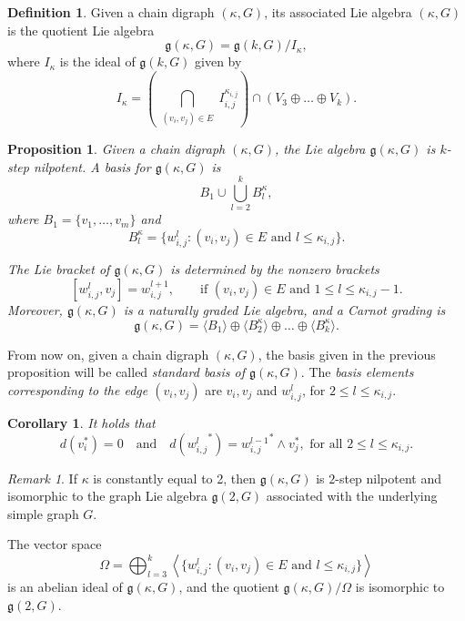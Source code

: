 \documentclass[a4paper,11pt]{amsart}
\newtheorem{corollary}[theorem]{Corollary}
\newtheorem{proposition}[theorem]{Proposition}
\theoremstyle{definition}
\newtheorem{definition}[theorem]{Definition}
\theoremstyle{remark}
\newtheorem{remark}[theorem]{Remark}
\numberwithin{equation}{section}
\newcommand{\g}{\mathfrak{g}}
\begin{document}
\begin{definition}
Given a chain digraph $(\kappa,G)$, 
its associated Lie algebra $(\kappa,G)$ is the quotient Lie algebra
\[
\g(\kappa,G)=\g(k,G)/ I_\kappa,
\]
where $I_\kappa$ is the ideal of $\g(k,G)$ given by
\[
I_\kappa=\left(\bigcap_{\substack{(v_i,v_j)\in E}} I_{i,j}^{\kappa_{i,j}}\right) \cap \left(V_3\oplus\dots\oplus V_k\right).
\]
\end{definition}


\begin{proposition}\label{prop:bracket}
Given a chain digraph $(\kappa,G)$, the Lie algebra $\g(\kappa,G)$ is $k$-step nilpotent. 
A basis for $\g(\kappa,G)$ is
\[
B_1\cup \bigcup_{l=2}^{k} B_l^\kappa,
\]
where $B_1=\{v_1,\dots, v_m\}$ and
\[
B_l^\kappa= \big\{w_{i,j}^l: (v_i,v_j)\in E \text{ and } l\leq \kappa_{i,j} \big\}.
\]

The Lie bracket of $\g(\kappa,G)$ is determined by the nonzero brackets
\[
[w_{i,j}^l, v_j]=w_{i,j}^{l+1}, \qquad \text{if } (v_i,v_j)\in E \text{ and } 1\leq l\leq \kappa_{i,j}-1.
\]
Moreover, $\g(\kappa,G)$ is a naturally graded Lie algebra, and a Carnot grading is
\[
\g(\kappa,G)=\langle B_1\rangle \oplus \langle B_2^{\kappa}\rangle \oplus\dots\oplus\langle B_k^{\kappa}\rangle .
\]
\end{proposition}

From now on, given a chain digraph \((\kappa,G)\), the basis given in the previous proposition will be called \emph{standard basis of \(\g(\kappa,G)\)}. The \emph{basis elements corresponding to the edge \((v_i,v_j)\)} are \(v_i, v_j\) and \(w_{i,j}^l\), for \(2\leq l\leq\kappa_{i,j}\). 

\begin{corollary}\label{coro:diff}
It holds that
\[
d(v_i^*)=0 \quad\text{and}\quad d({w_{i,j}^l}^*)={w_{i,j}^{l-1}}^* \wedge v_j^*, \text{ for all $2\le l\le \kappa_{i,j}$}.
\]
\end{corollary}

\begin{remark}
If $\kappa$ is constantly equal to 2, then $\g(\kappa,G)$ is $2$-step nilpotent and isomorphic to the graph Lie algebra $\g(2,G)$ associated 
with the underlying simple graph $G$.

The vector space
\[
\Omega=\bigoplus_{l=3}^k \left\langle\{w_{i,j}^l: (v_i,v_j)\in E \text{ and } l\leq \kappa_{i,j} \}\right\rangle
\]
is an abelian ideal of $\g(\kappa,G)$, and the quotient $\g(\kappa,G)/\Omega$ is isomorphic to $\g(2,G)$.
\end{remark}
\end{document}
